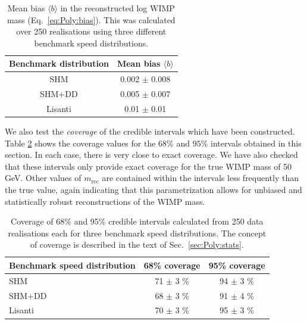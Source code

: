 \begin{table}[t]
  \setlength{\extrarowheight}{3pt}
  \setlength{\tabcolsep}{3pt}
  \begin{center}
	\begin{tabular}{c|c}
        \hline\hline
	Benchmark distribution & Mean bias $\langle b \rangle$ \\
	\hline
	SHM & 0.002 $\pm$ 0.008 \\
	SHM+DD & 0.005 $\pm$ 0.007 \\
	Lisanti \etal & 0.01 $\pm$ 0.01 \\
        \hline\hline
	\end{tabular}
  \end{center}
\caption[Mean bias in the reconstructed log WIMP mass using the \PLF method]{Mean bias $\langle b \rangle$ in the reconstructed log WIMP mass (Eq.~\ref{eq:Poly:bias}). This was calculated over 250 realisations using three different benchmark speed distributions.}
\label{tab:Poly:bias}
\end{table}

We also test the \textit{coverage} of the credible intervals which have been constructed. Table \ref{tab:Poly:coverage} shows the coverage values for the $68\%$ and $95\%$ intervals obtained in this section. In each case, there is very close to exact coverage. We have also checked that these intervals only provide exact coverage for the true WIMP mass of 50 GeV. Other values of $m_\textrm{rec}$ are contained within the intervals less frequently than the true value, again indicating that this parametrization allows for unbiased and statistically robust reconstructions of the WIMP mass.

\begin{table}[t]
  \setlength{\extrarowheight}{3pt}
  \setlength{\tabcolsep}{3pt}
  \begin{center}
	\begin{tabular}{m{1in}|cc}
        \hline\hline
	Benchmark speed distribution & 68\% coverage & 95\% coverage\\
	\hline
	SHM &  71 $\pm$ 3 \% & 94 $\pm$ 3 \%  \\
	SHM+DD & 68 $\pm$ 3 \% & 91 $\pm$ 4 \%  \\
	Lisanti\etal & 70 $\pm$ 3 \% & 95 $\pm$ 3 \%  \\
        \hline \hline
	\end{tabular}
  \end{center}
\caption[Credible interval coverage results for the \PLF method]{Coverage of 68\% and 95\% credible intervals calculated from 250 data realisations each for three benchmark speed distributions. The concept of coverage is described in the text of Sec.~\ref{sec:Poly:stats}.}
\label{tab:Poly:coverage}
\end{table}

